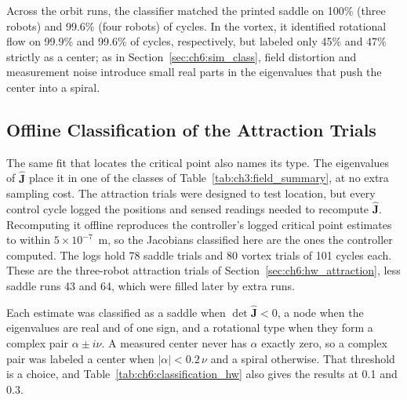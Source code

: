 Across the orbit runs, the classifier matched the printed saddle on 100\% (three robots) and 99.6\% (four robots) of cycles. In the vortex, it identified rotational flow on 99.9\% and 99.6\% of cycles, respectively, but labeled only 45\% and 47\% strictly as a center; as in Section~\ref{sec:ch6:sim_class}, field distortion and measurement noise introduce small real parts in the eigenvalues that push the center into a spiral.

\subsection{Offline Classification of the Attraction Trials}
\label{sec:ch6:classification_offline}

The same fit that locates the critical point also names its type. The
eigenvalues of $\hat{\mathbf{J}}$ place it in one of the classes of
Table~\ref{tab:ch3:field_summary}, at no extra sampling cost. The
attraction trials were designed to test location, but every control cycle
logged the positions and sensed readings needed to recompute
$\hat{\mathbf{J}}$. Recomputing it offline reproduces the controller's
logged critical point estimates to within $5\times10^{-7}$~m, so the
Jacobians classified here are the ones the controller computed. The
logs hold 78 saddle trials and 80 vortex trials of 101 cycles each. These
are the three-robot attraction trials of
Section~\ref{sec:ch6:hw_attraction}, less saddle runs 43 and 64, which
were filled later by extra runs.

Each estimate was classified as a saddle when $\det\hat{\mathbf{J}} < 0$,
a node when the eigenvalues are real and of one sign, and a rotational
type when they form a complex pair $\alpha \pm i\nu$. A measured center
never has $\alpha$ exactly zero, so a complex pair was labeled a center
when $|\alpha| < 0.2\,\nu$ and a spiral otherwise. That threshold is a
choice, and Table~\ref{tab:ch6:classification_hw} also gives the results
at 0.1 and 0.3.

